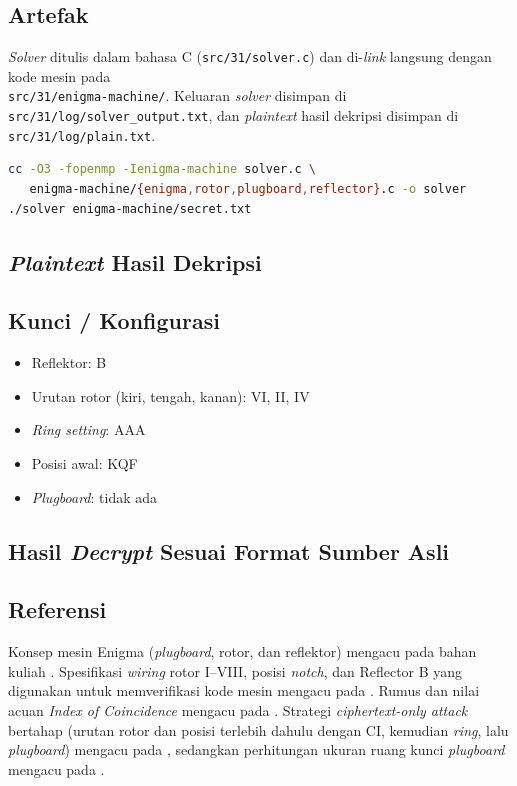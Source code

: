 \subsection*{Artefak}

\textit{Solver} ditulis dalam bahasa C (\texttt{src/31/solver.c}) dan di-\textit{link} langsung dengan 
kode mesin pada \\ \texttt{src/31/enigma-machine/}. Keluaran \textit{solver} disimpan di
\texttt{src/31/log/solver\_output.txt}, dan \textit{plaintext} hasil dekripsi disimpan di
\texttt{src/31/log/plain.txt}.
\begin{lstlisting}[language=bash,numbers=none]
cc -O3 -fopenmp -Ienigma-machine solver.c \
   enigma-machine/{enigma,rotor,plugboard,reflector}.c -o solver
./solver enigma-machine/secret.txt
\end{lstlisting}



\subsection*{\textit{Plaintext} Hasil Dekripsi}


\subsection*{Kunci / Konfigurasi}

\begin{itemize}[nosep]
  \item Reflektor: B
  \item Urutan rotor (kiri, tengah, kanan): VI, II, IV
  \item \textit{Ring setting}: AAA
  \item Posisi awal: KQF
  \item \textit{Plugboard}: tidak ada
\end{itemize}

\subsection*{Hasil \textit{Decrypt} Sesuai Format Sumber Asli}



\subsection*{Referensi}

Konsep mesin Enigma (\textit{plugboard}, rotor, dan reflektor) mengacu pada bahan kuliah \cite{munir-klasik2}.
Spesifikasi \textit{wiring} rotor I--VIII, posisi \textit{notch}, dan Reflector B yang digunakan untuk
memverifikasi kode mesin mengacu pada \cite{wiki-enigma-rotor}. Rumus dan nilai acuan \textit{Index of
Coincidence} mengacu pada \cite{wiki-ic}. Strategi \textit{ciphertext-only attack} bertahap (urutan rotor
dan posisi terlebih dahulu dengan CI, kemudian \textit{ring}, lalu \textit{plugboard}) mengacu pada
\cite{munir-klasik2}, sedangkan perhitungan ukuran ruang kunci \textit{plugboard} mengacu pada
\cite{wiki-enigma}.
